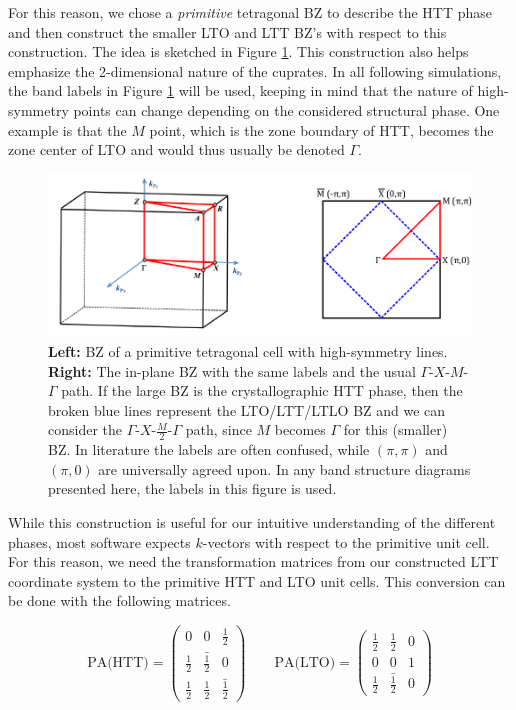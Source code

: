 For this reason, we chose a \emph{primitive} tetragonal BZ to describe the HTT phase and then construct the smaller LTO and LTT BZ's with respect to this construction. The idea is sketched in Figure \ref{fig:band_paths}. This construction also helps emphasize the 2-dimensional nature of the cuprates. In all following simulations, the band labels in Figure \ref{fig:band_paths} will be used, keeping in mind that the nature of high-symmetry points can change depending on the considered structural phase. One example is that the $M$ point, which is the zone boundary of HTT, becomes the zone center of LTO and would thus usually be denoted $\Gamma$.

\begin{figure}
    \centering
    \includegraphics{fig/simulation/band_paths.pdf}
    \caption[Band paths]{\textbf{Left:} BZ of a primitive tetragonal cell with high-symmetry lines. \textbf{Right:} The in-plane BZ with the same labels and the usual $\Gamma$-$X$-$M$-$\Gamma$ path. If the large BZ is the crystallographic HTT phase, then the broken blue lines represent the LTO/LTT/LTLO BZ and we can consider the $\Gamma$-$X$-$\frac{M}{2}$-$\Gamma$ path, since $M$ becomes $\Gamma$ for this (smaller) BZ. In literature the labels are often confused, while $(\pi,\pi)$ and $(\pi,0)$ are universally agreed upon. In any band structure diagrams presented here, the labels in this figure is used.} 
    \label{fig:band_paths}
\end{figure}

While this construction is useful for our intuitive understanding of the different phases, most software expects $k$-vectors with respect to the primitive unit cell. For this reason, we need the transformation matrices from our constructed LTT coordinate system to the primitive HTT and LTO unit cells. This conversion can be done with the following matrices.

\[
\text{PA(HTT)} =  
\begin{pmatrix}
0 & 0 & \frac{1}{2} \\
\frac{1}{2} & \bar{\frac{1}{2}} & 0 \\
\frac{1}{2} & \frac{1}{2} & \bar{\frac{1}{2}}
\end{pmatrix}
\qquad
\text{PA(LTO)} =  
\begin{pmatrix}
\frac{1}{2} & \frac{1}{2} & 0 \\
0 & 0 & 1 \\
\frac{1}{2} & \bar{\frac{1}{2}} & 0
\end{pmatrix}
\]

